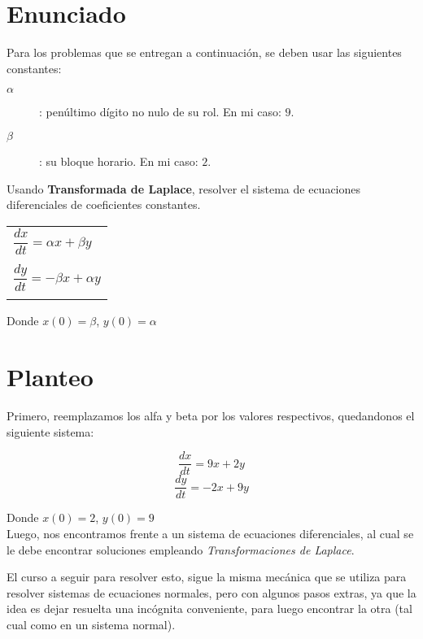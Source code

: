\documentclass[12pt,letterpaper]{article}
\begin{document}


\section{Enunciado}
Para los problemas que se entregan a continuación, se deben usar las siguientes constantes:
\begin{description}
\item[$\alpha$] : penúltimo dígito no nulo de su rol. En mi caso: $9$.
\item[$\beta$] : su bloque horario. En mi caso: $2$. 
\end{description}

Usando \textbf{Transformada de Laplace}, resolver el sistema de ecuaciones diferenciales de coeficientes constantes.

\begin{center}
	\begin{tabular}{ p{3.5cm} |}
	$\dfrac{dx}{dt} = \alpha x + \beta y$ \\
	\smallskip \\
	$\dfrac{dy}{dt} = -\beta x + \alpha y$ \\
	\smallskip \\
	\hline
	\end{tabular}
\end{center}

Donde $x(0)=\beta$, $y(0)=\alpha$

\section{Planteo}
Primero, reemplazamos los alfa y beta por los valores respectivos, quedandonos el siguiente sistema:

\begin{equation}\dfrac{dx}{dt} = 9 x + 2 y\end{equation}
\begin{equation}\dfrac{dy}{dt} = -2 x + 9 y\end{equation}

Donde $x(0)=2$, $y(0)=9$ \\

Luego, nos encontramos frente a un sistema de ecuaciones diferenciales, al cual se le debe encontrar soluciones empleando \textit{Transformaciones de Laplace}.

El curso a seguir para resolver esto, sigue la misma mecánica que se utiliza para resolver sistemas de ecuaciones normales, pero con algunos pasos extras, ya que la idea es dejar resuelta una incógnita conveniente, para luego encontrar la otra (tal cual como en un sistema normal).
\end{document}
